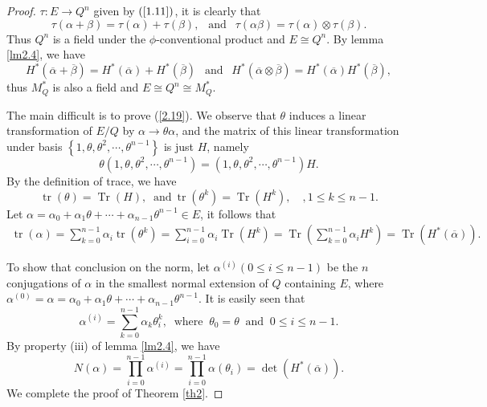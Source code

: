 \documentclass [11pt]{article}
\begin{document}
\begin{proof}
$\tau: E \rightarrow Q^{n}$ given by $(\ref{1.11})$,  it is clearly that
$$
\tau(\alpha+\beta)=\tau(\alpha)+\tau(\beta),\  \ \text { and } \ \ \tau(\alpha \beta)=\tau(\alpha)\otimes\tau(\beta).
$$
Thus $Q^{n}$ is a field under the $\phi$-conventional product and $E \cong Q^{n}$.  By lemma \ref{lm2.4}, we have
$$
H^{*}(\overline{\alpha}+\overline{\beta})=H^{*}(\overline{\alpha})+H^{*}(\overline{\beta}) \ \ \text { and }
\ \ H^{*}\left(\overline{\alpha} \otimes \overline{\beta}\right)=H^{*}(\overline{\alpha}) H^{*}(\overline{\beta}),
$$
thus $M_{Q}^{*}$ is also a field and $E \cong Q^{n} \cong M_{Q}^{*}$.

 The main difficult is to prove (\ref{2.19}).
We observe that $\theta$ induces a linear  transformation of $E/Q$ by $\alpha \rightarrow \theta \alpha$, and the matrix of this linear
 transformation under basis $\left\{1, \theta, \theta^{2},\cdots,  \theta^{n-1}\right\}$ is just $H$, namely
$$
\theta\left(1, \theta, \theta^{2}, \cdots, \theta^{n-1}\right)=\left(1 ,\theta , \theta^{2}, \cdots, \theta^{n -1}\right) H .
$$
By the definition of trace, we have
$$
\operatorname{tr}(\theta)=\operatorname{Tr}(H), \ \text{ and}\  \operatorname{tr}(\theta^{k})=\operatorname{Tr}(H^{k}), \quad, 1 \leq k \leq n-1.
$$
Let $\alpha=\alpha_{0}+\alpha_{1} \theta+\cdots+\alpha_{n-1} \theta^{n-1} \in E$, it follows that
$$
\begin{aligned}
\operatorname{tr}(\alpha) =\sum_{k=0}^{n-1} \alpha_{i} \operatorname{tr}\left(\theta^{k}\right)=\sum_{i=0}^{n-1} \alpha_{i}
\operatorname{Tr}\left(H^{k}\right) =\operatorname{Tr}\left(\sum_{k=0}^{n-1} \alpha_{i } H^{k}\right)=\operatorname{Tr}\left(H^{*}(\overline{\alpha})\right) .
\end{aligned}
$$

To show that conclusion on the norm, let $\alpha^{(i)}(0 \leq i \leq n-1)$ be the $n$ conjugations of $\alpha$ in the
 smallest normal extension of $Q$ containing $E$, where $\alpha^{(0)}=\alpha=\alpha_{0}+\alpha_{1} \theta+\cdots+ \alpha_{n-1} \theta^{n-1}$.
  It is easily seen that
$$
\alpha^{(i)}=\sum_{k=0}^{n-1} \alpha_{k} \theta_{i}^{k},\  \text { where }\  \theta_{0}=\theta \ \text { and } \ 0 \leq i \leq n-1.
$$
By property (iii) of lemma \ref{lm2.4}, we have
$$
N(\alpha)=\prod_{i=0}^{n-1} \alpha^{(i)}=\prod_{i=0}^{n-1} \alpha\left(\theta_{i}\right)=\operatorname{det}\left(H^{*}(\overline{\alpha})\right).
$$
We complete the proof of Theorem  \ref{th2}.
\end{proof}
\end{document}
